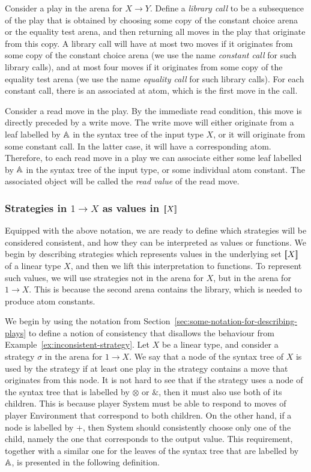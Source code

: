 Consider a play in the arena for $X \to Y$. Define a \emph{library call} to be a subsequence of the play that is obtained by choosing some copy of the constant choice arena or the equality test arena, and then returning all moves in the play that originate from this copy. A library call will have at most two moves if it originates from some copy of the constant choice arena (we use the name \emph{constant call} for such library calls), and at most four moves if it originates from some copy of the equality test arena (we use the name \emph{equality call} for such library calls). For each constant call, there is an associated at atom, which is the first move in the call. 

Consider a read move in the play. By the immediate read condition, this move is directly preceded by a write move. The write move will either originate from a leaf labelled by $\mathbb A$ in  the syntax tree of the input type $X$, or it will originate from some constant call. In the latter case, it will have a corresponding atom. Therefore, to each read move in a play we can associate either some leaf labelled by $\mathbb A$ in the syntax tree of the input type, or some individual atom constant. The associated object will be called the \emph{read value} of the read move.



\subsubsection{Strategies in $1 \to X$ as values in $[{\kern-0.45ex}[X]{\kern-0.45ex}]$}
\label{sec:strategies-in-1-to-x-as-elements-of-sem-x}
Equipped with the above notation, we are ready to define which strategies will be considered consistent, and how they can  be interpreted as values or functions.  We begin by describing strategies which represents values in the underlying set $[{\kern-0.45ex}[X]{\kern-0.45ex}]$ of a linear type $X$, and then we lift this interpretation to functions.  To represent such values, we will use strategies not in the arena for $X$, but in the arena for $1 \to X$. This is because the second arena contains the library, which is needed to  produce  atom constants.



We begin by using the notation from Section~\ref{sec:some-notation-for-describing-plays} to define a notion of consistency that disallows the behaviour from Example~\ref{ex:inconsistent-strategy}.     Let $X$ be a linear type, and consider a strategy $\sigma$ in the arena for $1 \to X$. We say that a node of the syntax tree of $X$ is used by the strategy if at least one play in the strategy contains a move that originates from this node. It is not hard to see that if the strategy uses  a node of the syntax tree that is  labelled by $\otimes$ or $\&$, then it must also use both of its children. This is because player System must be able to respond to moves of player Environment that correspond to both children. On the other hand, if a node is labelled by $+$, then System should consistently choose only one of the child, namely the one that corresponds to the output value. This requirement, together with a similar one for the leaves of the syntax tree that are labelled by $\mathbb A$, is presented in the following definition.



